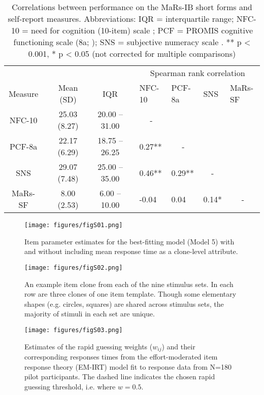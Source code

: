 \documentclass[a4paper,man,natbib]{apa6}
\begin{document}
\begin{table}
\centering
\begin{tabular*}{\textwidth}{ccccccllll}
\toprule
 & & & & & & \multicolumn{4}{c}{Spearman rank correlation} \\
\cmidrule(lr){7-10}
Measure & & Mean (SD) & & IQR & &  NFC-10 & PCF-8a & SNS & MaRs-SF \\
\midrule
NFC-10 & & 25.03 (8.27) & & 20.00 -- 31.00 & & \multicolumn{1}{c}{-} &  &  & \\
PCF-8a   &  & 22.17 (6.29) & & 18.75 -- 26.25 & & 0.27** &  \multicolumn{1}{c}{-} &  &  \\
SNS   &  & 29.07 (7.48) & & 25.00 -- 35.00 & & 0.46** &  0.29** &  \multicolumn{1}{c}{-} &   \\
MaRs-SF & &   8.00 (2.53) & &   6.00 -- 10.00 & & -0.04 &  0.04 &  0.14* &  \multicolumn{1}{c}{-} \\
\bottomrule
\end{tabular*}
\captionsetup{width=1.\textwidth}
\caption{\normalfont Correlations between performance on the MaRs-IB short forms and self-report measures. Abbreviations: IQR = interquartile range; NFC-10 = need for cognition (10-item) scale \citep{chiesi2018applying}; PCF = PROMIS cognitive functioning scale (8a; \citealt{iverson2021normative}); SNS = subjective numeracy scale \citep{fagerlin2007measuring}. ** p < 0.001,  * p < 0.05 (not corrected for multiple comparisons)}
\end{table}

\begin{figure}
\centering
\texttt{[image: figures/figS01.png]}
\caption{\label{fig:figS01} Item parameter estimates for the best-fitting model (Model 5) with and without including mean response time as a clone-level attribute.}
\end{figure}

\begin{figure}
\centering
\texttt{[image: figures/figS02.png]}
\caption{\label{fig:figS02} An example item clone from each of the nine stimulus sets. In each row are three clones of one item template. Though some elementary shapes (e.g. circles, squares) are shared across stimulus sets, the majority of stimuli in each set are unique.}
\end{figure}

\begin{figure}
\centering
\texttt{[image: figures/figS03.png]}
\caption{\label{fig:figS03} Estimates of the rapid guessing weights ($w_{ij}$) and their corresponding responses times from the effort-moderated item response theory (EM-IRT) model fit to response data from N=180 pilot participants. The dashed line indicates the chosen rapid guessing threshold, i.e. where $w = 0.5$.}
\end{figure}
\end{document}
